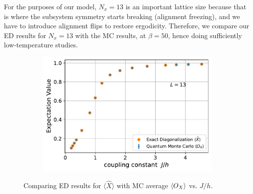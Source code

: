 \documentclass[../thesis_main.tex]{subfiles}
\begin{document}
For the purposes of our model, $N_x = 13$ is an important lattice size because that is where the subsystem symmetry starts breaking (alignment freezing), and we have to introduce alignment flips to restore ergodicity. Therefore, we compare our ED results for $N_x = 13$ with the MC results, at $\beta =50$, hence doing sufficiently low-temperature studies.

\begin{figure}[!htb]
    \centering
    \begin{subfigure}[b]{0.6\textwidth}
        \centering
        \includegraphics[width=\textwidth]{images/13_site/L=13_X.pdf}
    \end{subfigure}
    \caption{Comparing ED results for $\langle \hat{X} \rangle$ with MC average $\expval{O_X}$ vs. $J/h$.}
    \label{expvalX_ED_vs_MC_13}
\end{figure}
\end{document}
